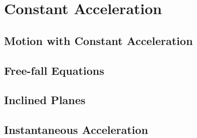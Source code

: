 \section{Constant Acceleration}

    \subsection{Motion with Constant Acceleration}
    \subsection{Free-fall Equations}
    \subsection{Inclined Planes}
    \subsection{Instantaneous Acceleration}